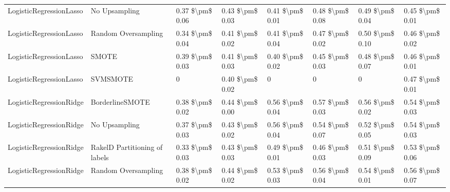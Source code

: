 \begin{tabular}{llllllll}
        LogisticRegressionLasso &                 No Upsampling & 0.37 \$\textbackslash pm\$ 0.06 &           0.43 \$\textbackslash pm\$ 0.03 &       0.41 \$\textbackslash pm\$ 0.01 &        0.48 \$\textbackslash pm\$ 0.08 &                         0.49 \$\textbackslash pm\$ 0.04 &     0.45 \$\textbackslash pm\$ 0.01 \\
        LogisticRegressionLasso &           Random Oversampling & 0.34 \$\textbackslash pm\$ 0.04 &           0.41 \$\textbackslash pm\$ 0.02 &       0.41 \$\textbackslash pm\$ 0.04 &        0.47 \$\textbackslash pm\$ 0.02 &                         0.50 \$\textbackslash pm\$ 0.10 &     0.46 \$\textbackslash pm\$ 0.02 \\
        LogisticRegressionLasso &                         SMOTE & 0.39 \$\textbackslash pm\$ 0.03 &           0.41 \$\textbackslash pm\$ 0.03 &       0.40 \$\textbackslash pm\$ 0.02 &        0.45 \$\textbackslash pm\$ 0.03 &                         0.48 \$\textbackslash pm\$ 0.07 &     0.46 \$\textbackslash pm\$ 0.01 \\
        LogisticRegressionLasso &                      SVMSMOTE &               0 &           0.40 \$\textbackslash pm\$ 0.02 &                     0 &                      0 &                                       0 &     0.47 \$\textbackslash pm\$ 0.01 \\
        LogisticRegressionRidge &               BorderlineSMOTE & 0.38 \$\textbackslash pm\$ 0.02 &           0.44 \$\textbackslash pm\$ 0.00 &       0.56 \$\textbackslash pm\$ 0.04 &        0.57 \$\textbackslash pm\$ 0.03 &                         0.56 \$\textbackslash pm\$ 0.02 &     0.54 \$\textbackslash pm\$ 0.03 \\
        LogisticRegressionRidge &                 No Upsampling & 0.37 \$\textbackslash pm\$ 0.03 &           0.43 \$\textbackslash pm\$ 0.02 &       0.56 \$\textbackslash pm\$ 0.04 &        0.54 \$\textbackslash pm\$ 0.07 &                         0.52 \$\textbackslash pm\$ 0.05 &     0.54 \$\textbackslash pm\$ 0.03 \\
        LogisticRegressionRidge & RakelD Partitioning of labels & 0.33 \$\textbackslash pm\$ 0.03 &           0.43 \$\textbackslash pm\$ 0.03 &       0.49 \$\textbackslash pm\$ 0.01 &        0.46 \$\textbackslash pm\$ 0.03 &                         0.51 \$\textbackslash pm\$ 0.09 &     0.53 \$\textbackslash pm\$ 0.06 \\
        LogisticRegressionRidge &           Random Oversampling & 0.38 \$\textbackslash pm\$ 0.02 &           0.44 \$\textbackslash pm\$ 0.02 &       0.53 \$\textbackslash pm\$ 0.03 &        0.56 \$\textbackslash pm\$ 0.04 &                         0.54 \$\textbackslash pm\$ 0.01 &     0.56 \$\textbackslash pm\$ 0.07 \\

\end{tabular}
